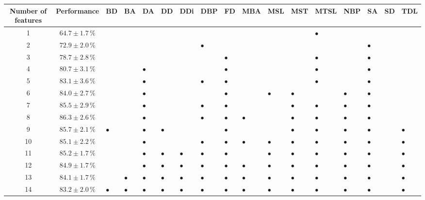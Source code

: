 \documentclass[11pt]{article}
\begin{document}
\begin{sidewaystable}
\begin{tabular}{cclllllllllllllll}
Number of features & Performance  & BD & BA & DA & DD & DDi & DBP & FD & MBA & MSL & MST & MTSL & NBP & SA & SD & TDL\\
\hline
1 & $64.7 \pm 1.7\,\%$  &  &  &  &  &  &  &  &  &  &  & $\bullet$ &  &  &  & \\
2 & $72.9 \pm 2.0\,\%$  &  &  &  &  &  & $\bullet$ &  &  &  &  &  &  & $\bullet$ &  & \\
3 & $78.7 \pm 2.8\,\%$  &  &  &  &  &  &  & $\bullet$ &  &  &  & $\bullet$ &  & $\bullet$ &  & \\
4 & $80.7 \pm 3.1\,\%$  &  &  & $\bullet$ &  &  &  & $\bullet$ &  &  &  & $\bullet$ &  & $\bullet$ &  & \\
5 & $83.1 \pm 3.6\,\%$  &  &  & $\bullet$ &  &  & $\bullet$ & $\bullet$ &  &  &  & $\bullet$ &  & $\bullet$ &  & \\
6 & $84.0 \pm 2.7\,\%$  &  &  & $\bullet$ &  &  &  & $\bullet$ &  & $\bullet$ & $\bullet$ &  & $\bullet$ & $\bullet$ &  & \\
7 & $85.5 \pm 2.9\,\%$  &  &  & $\bullet$ &  &  & $\bullet$ & $\bullet$ &  &  & $\bullet$ & $\bullet$ & $\bullet$ & $\bullet$ &  & \\
8 & $86.3 \pm 2.6\,\%$  &  &  & $\bullet$ &  &  & $\bullet$ & $\bullet$ & $\bullet$ &  & $\bullet$ & $\bullet$ & $\bullet$ & $\bullet$ &  & \\
9 & $85.7 \pm 2.1\,\%$  & $\bullet$ &  & $\bullet$ & $\bullet$ &  &  & $\bullet$ &  &  & $\bullet$ & $\bullet$ & $\bullet$ & $\bullet$ &  & $\bullet$\\
10 & $85.1 \pm 2.2\,\%$  &  &  & $\bullet$ &  &  & $\bullet$ & $\bullet$ & $\bullet$ & $\bullet$ & $\bullet$ & $\bullet$ & $\bullet$ & $\bullet$ &  & $\bullet$\\
11 & $85.2 \pm 1.7\,\%$  &  &  & $\bullet$ & $\bullet$ & $\bullet$ & $\bullet$ & $\bullet$ &  & $\bullet$ & $\bullet$ & $\bullet$ & $\bullet$ & $\bullet$ &  & $\bullet$\\
12 & $84.9 \pm 1.7\,\%$  &  &  & $\bullet$ & $\bullet$ & $\bullet$ & $\bullet$ & $\bullet$ & $\bullet$ & $\bullet$ & $\bullet$ & $\bullet$ & $\bullet$ & $\bullet$ &  & $\bullet$\\
13 & $84.1 \pm 1.7\,\%$  &  & $\bullet$ & $\bullet$ & $\bullet$ & $\bullet$ & $\bullet$ & $\bullet$ & $\bullet$ & $\bullet$ & $\bullet$ & $\bullet$ & $\bullet$ & $\bullet$ &  & $\bullet$\\
14 & $83.2 \pm 2.0\,\%$  & $\bullet$ & $\bullet$ & $\bullet$ & $\bullet$ & $\bullet$ & $\bullet$ & $\bullet$ & $\bullet$ & $\bullet$ & $\bullet$ & $\bullet$ & $\bullet$ & $\bullet$ &  & $\bullet$\\

\end{tabular}
\end{sidewaystable}
\end{document}
